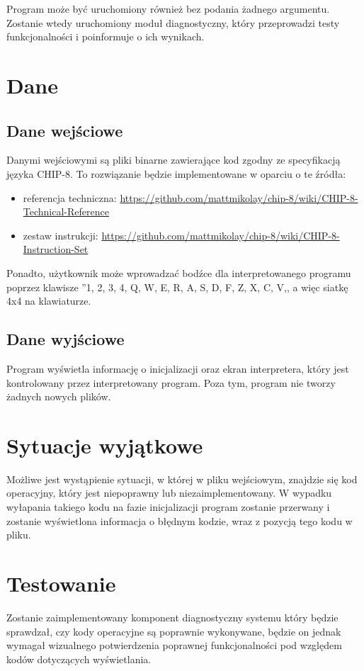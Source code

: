 \documentclass[a4paper,12pt]{report}
\begin{document}
Program może być uruchomiony również bez podania żadnego argumentu. Zostanie wtedy uruchomiony moduł diagnostyczny, który przeprowadzi testy funkcjonalności i poinformuje o ich wynikach.

\chapter{Dane}
\thispagestyle{fancy}

\section{Dane wejściowe}
Danymi wejściowymi są pliki binarne zawierające kod zgodny ze specyfikacją języka CHIP-8. To rozwiązanie będzie implementowane w oparciu o te źródła:
\begin{itemize}
    \item referencja techniczna: \href{https://github.com/mattmikolay/chip-8/wiki/CHIP\%E2\%80\%908-Technical-Reference}{https://github.com/mattmikolay/chip-8/wiki/CHIP-8-Technical-Reference}
    \item zestaw instrukcji: \href{https://github.com/mattmikolay/chip-8/wiki/CHIP\%E2\%80\%908-Instruction-Set}{https://github.com/mattmikolay/chip-8/wiki/CHIP-8-Instruction-Set}
\end{itemize}

Ponadto, użytkownik może wprowadzać bodźce dla interpretowanego programu poprzez klawisze ''1, 2, 3, 4, Q, W, E, R, A, S, D, F, Z, X, C, V,, a więc siatkę 4x4 na klawiaturze.

\section{Dane wyjściowe}
Program wyświetla informację o inicjalizacji oraz ekran interpretera, który jest kontrolowany przez interpretowany program. Poza tym, program nie tworzy żadnych nowych plików.

\chapter{Sytuacje wyjątkowe}
\thispagestyle{fancy}
Możliwe jest wystąpienie sytuacji, w której w pliku wejściowym, znajdzie się kod operacyjny, który jest niepoprawny lub niezaimplementowany. W wypadku wyłapania takiego kodu na fazie inicjalizacji program zostanie przerwany i zostanie wyświetlona informacja o błędnym kodzie, wraz z pozycją tego kodu w pliku.

\chapter{Testowanie}
\thispagestyle{fancy}
Zostanie zaimplementowany komponent diagnostyczny systemu który będzie sprawdzał, czy kody operacyjne są poprawnie wykonywane, będzie on jednak wymagał wizualnego potwierdzenia poprawnej funkcjonalności pod względem kodów dotyczących wyświetlania.
\end{document}
